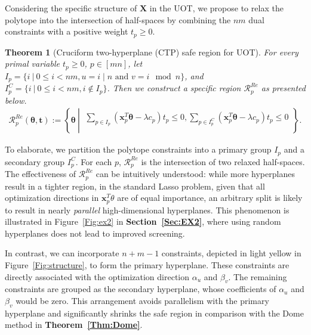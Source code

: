 \documentclass[11pt]{article}
\newtheorem{thm}{Theorem}
\newcommand{\mat}[1]{\mathbf{#1}}
\renewcommand{\vec}[1]{\bm{#1}}
\begin{document}
Considering the specific structure of $\mat X$ in the UOT, we propose to relax the polytope into the intersection of half-spaces by combining the $nm$ dual constraints with a positive weight $t_p \geq 0$.

\begin{thm}[Cruciform two-hyperplane (CTP) safe region for UOT]
\label{Thm:AreaScreeninguOT}
For every primal variable $t_p \geq 0$, $p \in [mn]$, let $I_p = \{ i \ | \ 0\leq i<nm, u = i\mid n \text{ and } v = i\mod n\}$, and ${I}^{C}_p = \{ i \ | \ 0\leq i<nm, i \notin I_p\}$. Then we construct a specific region $\mathcal{R}^{Re}_{p}$ as presented below.
\begin{equation}
\label{Eq:FinalRS}
\begin{split}
\mathcal{R}^{Re}_{p}(\vec{\theta}, \vec{t}):= \left\{\vec{\theta} \ \left|\
\begin{aligned}
\sum_{p\in I_p}(\vec{x}_{p}^{T}\vec{\theta} - \lambda {c}_p)t_p\leq 0, \sum_{p\in {I}^{C}_p}(\vec{x}_{p} ^{T}\vec{\theta}- \lambda {c}_p)t_p\leq 0 \\
\end{aligned}
\right.
\right\}.
\end{split}
\end{equation}
\end{thm}

To elaborate, we partition the polytope constraints into a primary group $I_p$ and a secondary group ${I}^{C}_p$. For each $p$, $\mathcal{R}^{Re}_{p}$ is the intersection of two relaxed half-spaces. The effectiveness of $\mathcal{R}^{Re}_{p}$ can be intuitively understood: while more hyperplanes result in a tighter region, in the standard Lasso problem, given that all optimization directions in $\vec x_p^{T} \theta$ are of equal importance, an arbitrary split is likely to result in nearly {\it parallel} high-dimensional hyperplanes. This phenomenon is illustrated in Figure~\ref{Fig:ex2} in {\bf Section~\ref{Sec:EX2}}, where using random hyperplanes does not lead to improved screening.

In contrast, we can incorporate $n+m -1$ constraints, depicted in light yellow in Figure~\ref{Fig:structure}, to form the primary hyperplane. These constraints are directly associated with the optimization direction $\alpha_u$ and $\beta_v$. The remaining constraints are grouped as the secondary hyperplane, whose coefficients of $\alpha_u$ and $\beta_v$ would be zero. This arrangement avoids parallelism with the primary hyperplane and significantly shrinks the safe region in comparison with the Dome method in {\bf Theorem~\ref{Thm:Dome}}.
\end{document}
